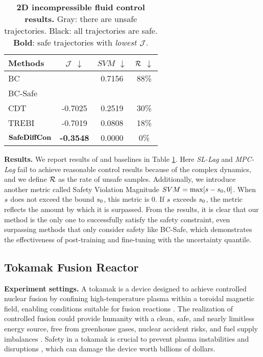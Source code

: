 \begin{table}[ht]
\centering
\vspace{-2pt}  %
\caption{\textbf{2D incompressible fluid control results.} {\color{gray} Gray}: there are unsafe trajectories. Black: all trajectories are safe. \textbf{Bold}: safe trajectories with \emph{lowest} $\mathcal{J}$.}
\vspace{-5pt}  %
\begin{tabular}{@{}l|c|cc@{}}
    \toprule
    Methods    & $\mathcal{J}$ $\downarrow$ & $SVM$ $\downarrow$ & $\mathcal{R}$ $\downarrow$ \\ \midrule
    BC  &  \color{gray}{-0.7104}  & \color{gray}0.7156 &  \color{gray}88\%  \\
    BC-Safe &  \color{gray}{-0.2520}  &   \color{gray}{0.0330} &  \color{gray}{8\%}   \\
    CDT     &  \color{gray}-0.7025  &   \color{gray}0.2519 &  \color{gray}30\%  \\
    TREBI   &  \color{gray}-0.7019  & \color{gray}0.0808  &  \color{gray}18\%  \\\midrule
    ${\textbf{SafeDiffCon}}$   & {\textbf{-0.3548}}  & {{0.0000}}   & {{0\%}}   \\ \bottomrule
\end{tabular}
\vspace{-2pt}  %
\label{tab:2d}
\end{table}

\textbf{Results.} We report results of \proj and baselines in Table \ref{tab:2d}. Here \textit{SL-Lag} and \textit{MPC-Lag} fail to achieve reasonable control results because of the complex dynamics, and we define $\mathcal{R}$ as the rate of unsafe samples. Additionally, we introduce another metric called Safety Violation Magnitude $SVM=\max[s - s_0, 0]$. When \(s\) does not exceed the bound \(s_0\), this metric is 0. If \(s\) exceeds \(s_0\), the metric reflects the amount by which it is surpassed. From the results, it is clear that our method is the only one to successfully satisfy the safety constraint, even surpassing methods that only consider safety like BC-Safe, which demonstrates the effectiveness of post-training and fine-tuning with the uncertainty quantile.

\subsection{Tokamak Fusion Reactor}
\textbf{Experiment settings.}
A tokamak is a device designed to achieve controlled nuclear fusion by confining high-temperature plasma within a toroidal magnetic field, enabling conditions suitable for fusion reactions \cite{federici2001plasma}. The realization of controlled fusion could provide humanity with a clean, safe, and nearly limitless energy source, free from greenhouse gases, nuclear accident risks, and fuel supply imbalances \cite{schuster2006role}. Safety in a tokamak is crucial to prevent plasma instabilities and disruptions \cite{kates2019predicting}, which can damage the device worth billions of dollars.

